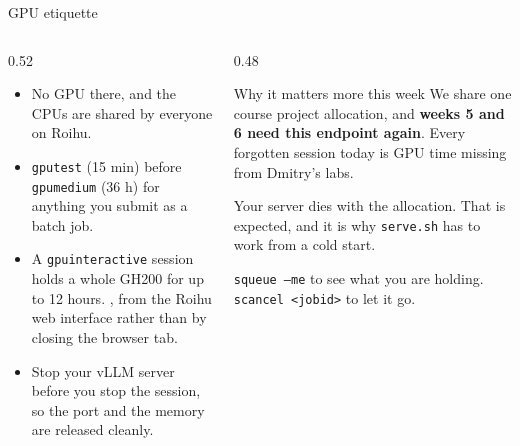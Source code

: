 \documentclass[aspectratio=169,10pt]{beamer}
\begin{document}
\begin{frame}{GPU etiquette}
  \begin{columns}[T]
    \begin{column}{0.52\textwidth}
      \begin{itemize}
        \item {} No GPU there, and the CPUs
          are shared by everyone on Roihu.
        \item \texttt{gputest} (15 min) before \texttt{gpumedium} (36 h) for
          anything you submit as a batch job.
        \item A \texttt{gpuinteractive} session holds a whole GH200 for up to
          12 hours. , from the Roihu web
          interface rather than by closing the browser tab.
        \item Stop your vLLM server before you stop the session, so the port
          and the memory are released cleanly.
      \end{itemize}
    \end{column}
    \begin{column}{0.48\textwidth}
      \begin{block}{Why it matters more this week}
        \small
        We share one course project allocation, and \textbf{weeks 5 and 6 need
        this endpoint again}. Every forgotten session today is GPU time missing
        from Dmitry's labs.
      \end{block}
      \vspace{0.5em}
      \small
      Your server dies with the allocation. That is expected, and it is why
      \texttt{serve.sh} has to work from a cold start.
      \vspace{0.3em}

      \texttt{squeue --me} to see what you are holding.
      \texttt{scancel <jobid>} to let it go.
    \end{column}
  \end{columns}
\end{frame}
\end{document}
